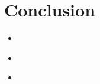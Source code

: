 \section{Conclusion}
\medskip
\begin{itemize}
    How was the work divided up?
What are your conclusions/observations about the models you used and the sonnets generated?

    \item {} \\

    \item {} \\

    \item {} \\

\end{itemize}


